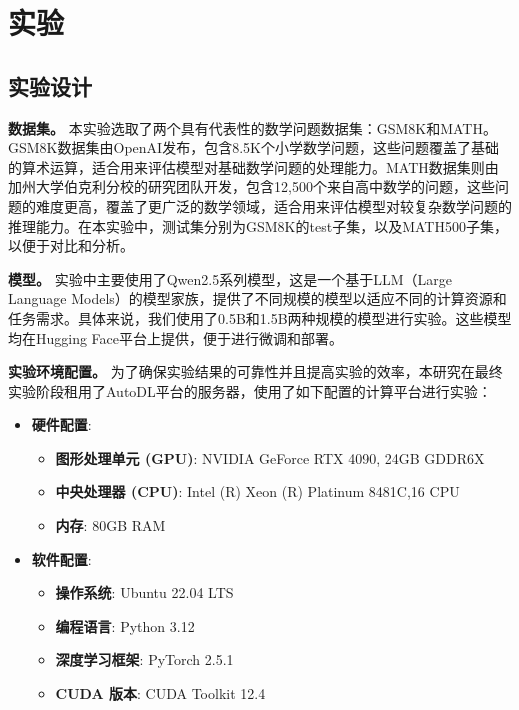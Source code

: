 \section{实验}
\label{sec:experiments}

\subsection{实验设计}

\textbf{数据集。} 本实验选取了两个具有代表性的数学问题数据集：GSM8K\citep{cobbe2021training}和MATH\citep{hendrycksmath2021}。GSM8K数据集由OpenAI发布，包含8.5K个小学数学问题，这些问题覆盖了基础的算术运算，适合用来评估模型对基础数学问题的处理能力。MATH数据集则由加州大学伯克利分校的研究团队开发，包含12,500个来自高中数学的问题，这些问题的难度更高，覆盖了更广泛的数学领域，适合用来评估模型对较复杂数学问题的推理能力。在本实验中，测试集分别为GSM8K的test子集，以及MATH500子集，以便于对比和分析。

\textbf{模型。} 实验中主要使用了Qwen2.5系列模型\citep{qwen2.5}，这是一个基于LLM（Large Language Models）的模型家族，提供了不同规模的模型以适应不同的计算资源和任务需求。具体来说，我们使用了0.5B和1.5B两种规模的模型进行实验。这些模型均在Hugging Face平台上提供，便于进行微调和部署。

\textbf{实验环境配置。} 
为了确保实验结果的可靠性并且提高实验的效率，本研究在最终实验阶段租用了AutoDL平台的服务器，使用了如下配置的计算平台进行实验：
\begin{itemize}
    \item \textbf{硬件配置}:
        \begin{itemize}
            \item \textbf{图形处理单元 (GPU)}: NVIDIA GeForce RTX 4090, 24GB GDDR6X 
            \item \textbf{中央处理器 (CPU)}: Intel (R) Xeon (R) Platinum 8481C,16 CPU
            \item \textbf{内存}: 80GB RAM
        \end{itemize}
    \item \textbf{软件配置}:
        \begin{itemize}
            \item \textbf{操作系统}: Ubuntu 22.04 LTS
            \item \textbf{编程语言}: Python 3.12
            \item \textbf{深度学习框架}: PyTorch 2.5.1
            \item \textbf{CUDA 版本}: CUDA Toolkit 12.4 \end{itemize}
\end{itemize}

